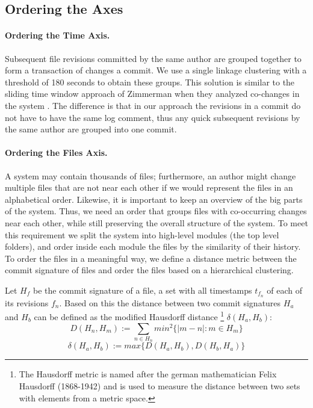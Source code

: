 \subsection{Ordering the Axes}

\paragraph{Ordering the Time Axis.}
Subsequent file revisions committed by the same author are grouped together to form a transaction of changes \ie a commit. We use a single linkage clustering with a threshold of 180 seconds to obtain these groups. This solution is similar to the sliding time window approach of Zimmerman \etal when they analyzed co-changes in the system \cite{Zimm04a}. The difference is that in our approach the revisions in a commit do not have to have the same log comment, thus any quick subsequent revisions by the same author are grouped into one commit.

\paragraph{Ordering the Files Axis.}
A system may contain thousands of files; furthermore, an author might change multiple files that are not near each other if we would represent the files in an alphabetical order. Likewise, it is important to keep an overview of the big parts of the system. Thus, we need an order that groups files with co-occurring changes near each other, while still preserving the overall structure of the system. To meet this requirement we split the system into high-level modules (\eg the top level folders), and order inside each module the files by the similarity of their history. To order the files in a meaningful way, we define a distance metric between the commit signature of files and order the files based on a hierarchical clustering.

Let $H_f$ be the commit signature of a file, a set with all timestamps $t_{f_n}$ of each of its revisions $f_n$. Based on this the distance between two commit signatures $H_a$ and $H_b$ can be defined as the modified Hausdorff distance \footnote{The Hausdorff metric is named after the german mathematician Felix Hausdorff (1868-1942) and is used to measure the distance between two sets with elements from a metric space.} $\delta(H_a,H_b)$:
\[
D(H_n,H_m) := \sum_{n \in H_n} min^2 \{ \vert m -n \vert : m \in H_m \}
\]
\[
\delta(H_a,H_b) := max \{ D(H_a,H_b), D(H_b,H_a) \}
\]

